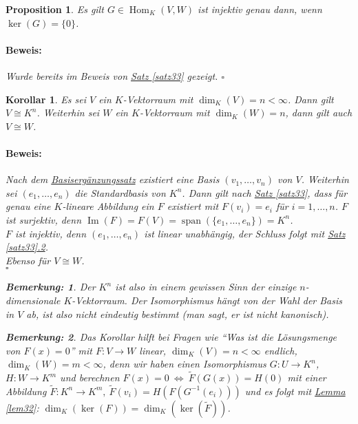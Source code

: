 \documentclass{report}
\DeclareMathOperator{\Span}{span}
\DeclareMathOperator{\Hom}{Hom}
\DeclareMathOperator{\Ima}{Im}
\theoremstyle{customrem}
\newtheorem*{bem}{Bemerkung:}
\theoremstyle{customdef}
\newtheorem{prop}[definition]{Proposition}
\newtheorem{kor}[definition]{Korollar}
\renewenvironment{proof}{\vspace{-.75cm}\paragraph{Beweis: }}{\vspace{-.5cm}\hfill$\square$}
\begin{document}
	\begin{prop}
		Es gilt $G\in\Hom_K(V, W)$ ist injektiv genau dann, wenn $\ker(G)=\{0\}$.\\
		\begin{proof}
			Wurde bereits im Beweis von \hyperref[satz33]{Satz \ref{satz33}} gezeigt. 
		\end{proof}
	\end{prop}
	\vspace{.25cm}
	\begin{kor}
		Es sei $V$ ein $K$-Vektorraum mit $\dim_K(V)=n<\infty$. Dann gilt $V\cong K^n$. Weiterhin sei $W$ ein $K$-Vektorraum mit $\dim_K(W)=n$, dann gilt auch $V\cong W$.\\
		
		\begin{proof}
			Nach dem \hyperref[satz218]{Basisergänzungssatz} existiert eine Basis $(v_1,\ldots, v_n)$ von $V$. Weiterhin sei $(e_1, \ldots, e_n)$ die Standardbasis von $K^n$. Dann gilt nach \hyperref[satz33]{Satz \ref{satz33}}, dass für genau eine $K$-lineare Abbildung ein $F$ existiert mit $F(v_i)=e_i$ für $i=1, \ldots, n$. $F$ ist surjektiv, denn $\Ima(F)=F(V)=\Span(\{e_1, \ldots, e_n\})=K^n$. \\
			$F$ ist injektiv, denn $(e_1, \ldots, e_n)$ ist linear unabhängig, der Schluss folgt mit \hyperref[satz33]{Satz \ref{satz33}.2}.\\
						
			\noindent Ebenso für $V\cong W$.\\
		\end{proof}
		\begin{bem}
			Der $K^n$ ist also in einem gewissen Sinn der einzige $n$-dimensionale $K$-Vektorraum. Der Isomorphismus hängt von der Wahl der Basis in $V$ ab, ist also nicht eindeutig bestimmt (man sagt, er ist nicht kanonisch).\\
		\end{bem}
		\begin{bem}
			Das Korollar hilft bei Fragen wie "`Was ist die Lösungsmenge von $F(x)=0$"' mit $F:V\to W$ linear, $\dim_K(V) = n<\infty$ endlich, $\dim_K(W) = m<\infty$, denn wir haben einen Isomorphismus $G:U\to K^n$, $H:W\to K^m$ und berechnen $F(x)=0\ \Leftrightarrow\ \tilde{F}(G(x)) = H(0)$ mit einer Abbildung $\tilde{F}:K^n\to K^m,\ \tilde{F}(v_i) = H(F(G^{-1}(e_i)))$ und es folgt mit \hyperref[lem32]{Lemma \ref{lem32}}: $\dim_K(\ker(F)) = \dim_K(\ker(\tilde{F}))$.\\
		\end{bem}
	\end{kor}
	
\end{document}
